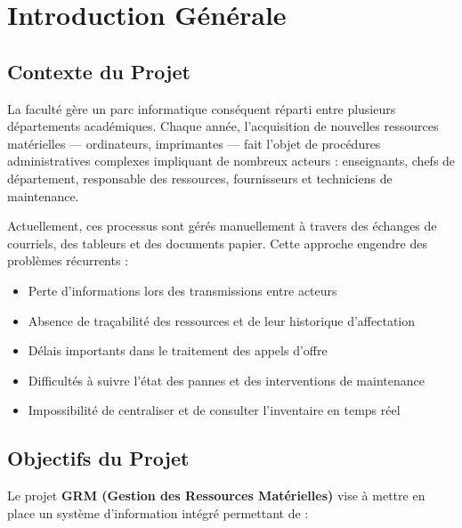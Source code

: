 \documentclass[12pt,a4paper]{report}
\begin{document}
\tableofcontents
\newpage

\chapter{Introduction Générale}

\section{Contexte du Projet}

La faculté gère un parc informatique conséquent réparti entre plusieurs départements académiques. Chaque année, l'acquisition de nouvelles ressources matérielles — ordinateurs, imprimantes — fait l'objet de procédures administratives complexes impliquant de nombreux acteurs : enseignants, chefs de département, responsable des ressources, fournisseurs et techniciens de maintenance.

Actuellement, ces processus sont gérés manuellement à travers des échanges de courriels, des tableurs et des documents papier. Cette approche engendre des problèmes récurrents :

\begin{itemize}[leftmargin=1.5cm]
    \item Perte d'informations lors des transmissions entre acteurs
    \item Absence de traçabilité des ressources et de leur historique d'affectation
    \item Délais importants dans le traitement des appels d'offre
    \item Difficultés à suivre l'état des pannes et des interventions de maintenance
    \item Impossibilité de centraliser et de consulter l'inventaire en temps réel
\end{itemize}

\section{Objectifs du Projet}

Le projet \textbf{GRM (Gestion des Ressources Matérielles)} vise à mettre en place un système d'information intégré permettant de :
\end{document}
